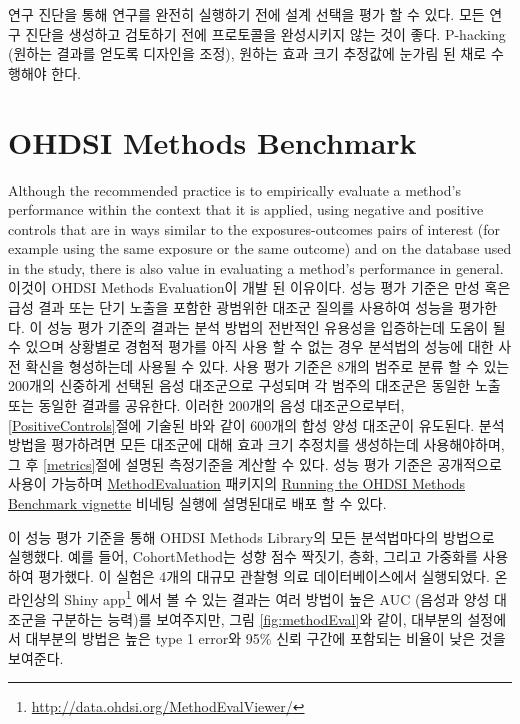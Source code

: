 \documentclass[11pt]{book}
\let\rmarkdownfootnote\footnote%
\def\footnote{\protect\rmarkdownfootnote}
\theoremstyle{definition}
\theoremstyle{definition}
\theoremstyle{definition}
\theoremstyle{remark}
\let\BeginKnitrBlock\begin \let\EndKnitrBlock\end
\begin{document}
\BeginKnitrBlock{rmdimportant}
연구 진단을 통해 연구를 완전히 실행하기 전에 설계 선택을 평가 할 수
있다. 모든 연구 진단을 생성하고 검토하기 전에 프로토콜을 완성시키지 않는
것이 좋다. P-hacking (원하는 결과를 얻도록 디자인을 조정), 원하는 효과
크기 추정값에 눈가림 된 채로 수행해야 한다.
\EndKnitrBlock{rmdimportant}

\section{OHDSI Methods Benchmark}\label{ohdsi-methods-benchmark}


Although the recommended practice is to empirically evaluate a method's
performance within the context that it is applied, using negative and
positive controls that are in ways similar to the exposures-outcomes
pairs of interest (for example using the same exposure or the same
outcome) and on the database used in the study, there is also value in
evaluating a method's performance in general. 이것이 OHDSI Methods
Evaluation이 개발 된 이유이다. 성능 평가 기준은 만성 혹은 급성 결과 또는
단기 노출을 포함한 광범위한 대조군 질의를 사용하여 성능을 평가한다. 이
성능 평가 기준의 결과는 분석 방법의 전반적인 유용성을 입증하는데 도움이
될 수 있으며 상황별로 경험적 평가를 아직 사용 할 수 없는 경우 분석법의
성능에 대한 사전 확신을 형성하는데 사용될 수 있다. 사용 평가 기준은
8개의 범주로 분류 할 수 있는 200개의 신중하게 선택된 음성 대조군으로
구성되며 각 범주의 대조군은 동일한 노출 또는 동일한 결과를 공유한다.
이러한 200개의 음성 대조군으로부터, \ref{PositiveControls}절에 기술된
바와 같이 600개의 합성 양성 대조군이 유도된다. 분석 방법을 평가하려면
모든 대조군에 대해 효과 크기 추정치를 생성하는데 사용해야하며, 그 후
\ref{metrics}절에 설명된 측정기준을 계산할 수 있다. 성능 평가 기준은
공개적으로 사용이 가능하며
\href{https://ohdsi.github.io/MethodEvaluation/}{MethodEvaluation}
패키지의
\href{https://ohdsi.github.io/MethodEvaluation/articles/OhdsiMethodsBenchmark.html}{Running
the OHDSI Methods Benchmark vignette} 비네팅 실행에 설명된대로 배포 할
수 있다.

이 성능 평가 기준을 통해 OHDSI Methods Library의 모든 분석법마다의
방법으로 실행했다. 예를 들어, CohortMethod는 성향 점수 짝짓기, 층화,
그리고 가중화를 사용하여 평가했다. 이 실험은 4개의 대규모 관찰형 의료
데이터베이스에서 실행되었다. 온라인상의 Shiny app\footnote{\url{http://data.ohdsi.org/MethodEvalViewer/}}
에서 볼 수 있는 결과는 여러 방법이 높은 AUC (음성과 양성 대조군을
구분하는 능력)를 보여주지만, 그림 \ref{fig:methodEval}와 같이, 대부분의
설정에서 대부분의 방법은 높은 type 1 error와 95\% 신뢰 구간에 포함되는
비율이 낮은 것을 보여준다.
\end{document}
